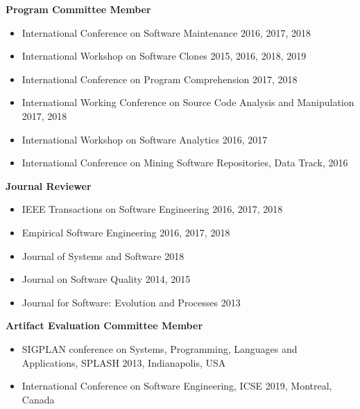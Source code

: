 \documentclass[letterpaper,11pt]{article}
\begin{document}
\textbf{Program Committee Member}


\begin{itemize}

  \vspace{-5pt}\item\small{International Conference on Software Maintenance 2016, 2017, 2018}
  \vspace{-5pt}\item\small{International Workshop on Software Clones 2015, 2016, 2018, 2019}
  \vspace{-5pt}\item\small{International Conference on Program Comprehension 2017, 2018}
  \vspace{-5pt}\item\small{ International Working Conference on Source Code Analysis and Manipulation 2017, 2018}
  \vspace{-5pt}\item\small{ International Workshop on Software Analytics 2016, 2017}
   \vspace{-5pt}\item\small{International Conference on Mining Software Repositories, Data Track, 2016}

\end{itemize}

\textbf{Journal Reviewer}

\begin{itemize}

  \vspace{-5pt}\item\small{IEEE Transactions on Software Engineering 2016, 2017, 2018}
  \vspace{-5pt}\item\small{Empirical Software Engineering 2016, 2017, 2018}
  \vspace{-5pt}\item\small{Journal of Systems and Software 2018}
  \vspace{-5pt}\item\small{Journal on Software Quality 2014, 2015}
  \vspace{-5pt}\item\small{Journal for Software: Evolution and Processes 2013}

\end{itemize}

\textbf{Artifact Evaluation Committee Member}

\begin{itemize}
  \vspace{-5pt}\item\small{SIGPLAN conference on Systems, Programming, Languages and Applications, SPLASH 2013,
Indianapolis, USA}
  \vspace{-5pt}\item\small{International Conference on Software Engineering, ICSE 2019,
Montreal, Canada}

\end{itemize}
\end{document}
